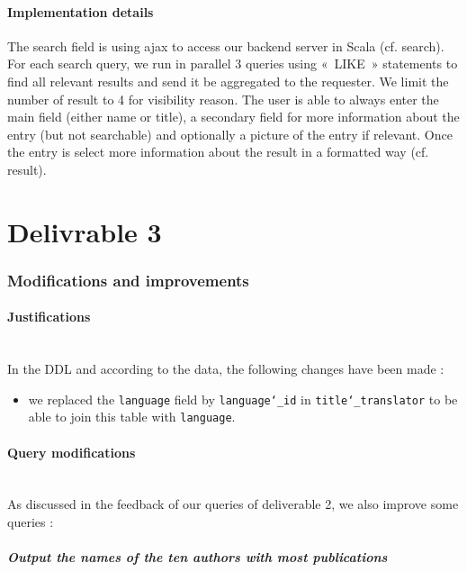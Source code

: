 \documentclass[doubleside, titlepage]{article}
\begin{document}
\subsection{Implementation details}

The search field is using ajax to access our backend server in Scala (cf. search). For each search query, we run in parallel 3 queries using « LIKE » statements to find all relevant results and send it be aggregated to the requester. We limit the number of result to 4 for visibility reason. The user is able to always enter the main field (either name or title), a secondary field for more information about the entry (but not searchable) and optionally a picture of the entry if relevant. Once the entry is select more information about the result in a formatted way (cf. result).

\newpage
\part{Delivrable 3}

\setcounter{section}{0}

\section{Modifications and improvements}

\subsection{Justifications}
~\\
In the DDL and according to the data, the following changes have been made :
\begin{itemize}
	\item we replaced the \texttt{language} field by \texttt{language\char`_id} in \texttt{title\char`_translator} to be able to join this table with \texttt{language}.
\end{itemize}

\subsection{Query modifications}
~\\
As discussed in the feedback of our queries of deliverable 2, we also improve some queries :

\subsubsection{Output the names of the ten authors with most publications}
\end{document}
